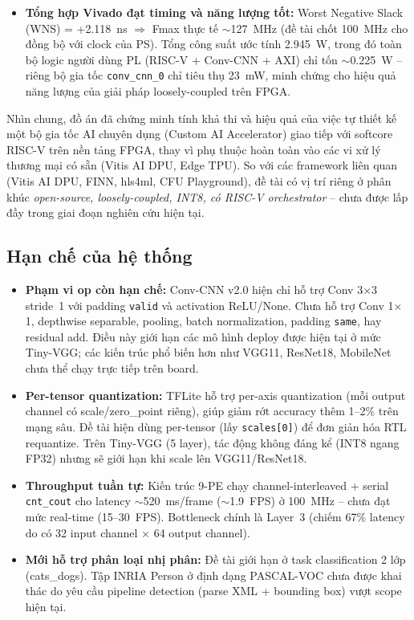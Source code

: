 \begin{itemize}
    \item \textbf{Tổng hợp Vivado đạt timing và năng lượng tốt:} Worst Negative Slack (WNS) = +2.118~ns $\Rightarrow$ Fmax thực tế $\sim$127~MHz (đề tài chốt 100~MHz cho đồng bộ với clock của PS). Tổng công suất ước tính 2.945~W, trong đó toàn bộ logic người dùng PL (RISC-V + Conv-CNN + AXI) chỉ tốn $\sim$0.225~W -- riêng bộ gia tốc \texttt{conv\_cnn\_0} chỉ tiêu thụ 23~mW, minh chứng cho hiệu quả năng lượng của giải pháp loosely-coupled trên FPGA.
\end{itemize}

Nhìn chung, đồ án đã chứng minh tính khả thi và hiệu quả của việc tự thiết kế một bộ gia tốc AI chuyên dụng (Custom AI Accelerator) giao tiếp với softcore RISC-V trên nền tảng FPGA, thay vì phụ thuộc hoàn toàn vào các vi xử lý thương mại có sẵn (Vitis AI DPU, Edge TPU). So với các framework liên quan (Vitis AI DPU, FINN, hls4ml, CFU Playground), đề tài có vị trí riêng ở phân khúc \textit{open-source, loosely-coupled, INT8, có RISC-V orchestrator} -- chưa được lấp đầy trong giai đoạn nghiên cứu hiện tại.

\subsection{Hạn chế của hệ thống}
\begin{itemize}
    \item \textbf{Phạm vi op còn hạn chế:} Conv-CNN v2.0 hiện chỉ hỗ trợ Conv 3$\times$3 stride~1 với padding \texttt{valid} và activation ReLU/None. Chưa hỗ trợ Conv 1$\times$1, depthwise separable, pooling, batch normalization, padding \texttt{same}, hay residual add. Điều này giới hạn các mô hình deploy được hiện tại ở mức Tiny-VGG; các kiến trúc phổ biến hơn như VGG11, ResNet18, MobileNet chưa thể chạy trực tiếp trên board.
    \item \textbf{Per-tensor quantization:} TFLite hỗ trợ per-axis quantization (mỗi output channel có scale/zero\_point riêng), giúp giảm rớt accuracy thêm 1--2\% trên mạng sâu. Đề tài hiện dùng per-tensor (lấy \texttt{scales[0]}) để đơn giản hóa RTL requantize. Trên Tiny-VGG (5 layer), tác động không đáng kể (INT8 ngang FP32) nhưng sẽ giới hạn khi scale lên VGG11/ResNet18.
    \item \textbf{Throughput tuần tự:} Kiến trúc 9-PE chạy channel-interleaved + serial \texttt{cnt\_cout} cho latency $\sim$520~ms/frame ($\sim$1.9~FPS) ở 100~MHz -- chưa đạt mức real-time (15--30~FPS). Bottleneck chính là Layer~3 (chiếm 67\% latency do có 32 input channel $\times$ 64 output channel).
    
    \item \textbf{Mới hỗ trợ phân loại nhị phân:} Đề tài giới hạn ở task classification 2 lớp (cats\_dogs). Tập INRIA Person ở định dạng PASCAL-VOC chưa được khai thác do yêu cầu pipeline detection (parse XML + bounding box) vượt scope hiện tại.
\end{itemize}

